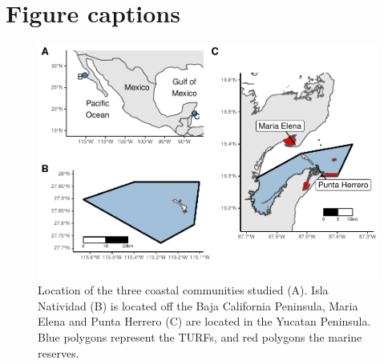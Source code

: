 \documentclass{frontiersSCNS}
\begin{document}
\clearpage



\clearpage

\section*{Figure captions}

\begin{figure}
\centering
\includegraphics{Villasenor-Derbez_files/figure-latex/unnamed-chunk-7-1.pdf}
\caption{\label{fig:unnamed-chunk-7}\label{fig:map}Location of the three
coastal communities studied (A). Isla Natividad (B) is located off the
Baja California Peninsula, Maria Elena and Punta Herrero (C) are located
in the Yucatan Peninsula. Blue polygons represent the TURFs, and red
polygons the marine reserves.}
\end{figure}
\end{document}
